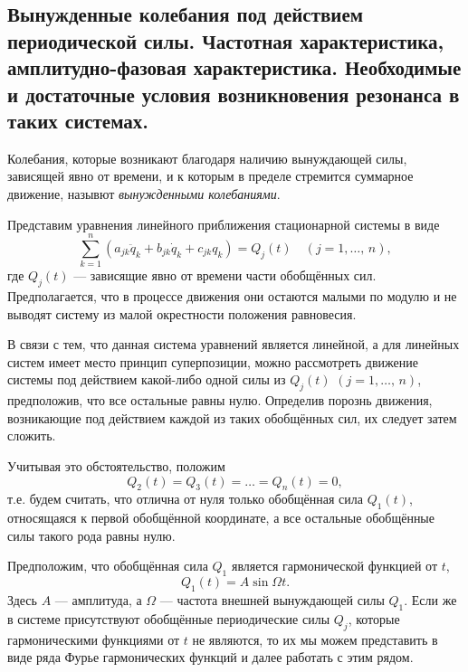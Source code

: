 \documentclass[a4paper]{article}
\begin{document}
\subsection{Вынужденные колебания под действием периодической силы. Частотная
характеристика, амплитудно-фазовая характеристика. Необходимые и достаточные
условия возникновения резонанса в таких системах.}
\begin{dfn}
	Колебания, которые возникают благодаря наличию вынуждающей силы,
	зависящей явно от времени, и к которым в пределе стремится суммарное
	движение, назывют \emph{вынужденными колебаниями}.
\end{dfn}
Представим уравнения линейного приближения стационарной системы в виде
\[
	\sum_{k=1}^{n} (a_{jk}\ddot{q}_k+b_{jk}\dot{q}_k+c_{jk}q_k)=Q_j (t)
	\quad (j=1,\ldots,\,n),
\] 
где $Q_j (t)$ --- зависящие явно от времени части обобщённых сил.
Предполагается, что в процессе движения они остаются малыми по модулю и не
выводят систему из малой окрестности положения равновесия.

В связи с тем, что данная система уравнений является линейной, а для линейных
систем имеет место принцип суперпозиции, можно рассмотреть движение системы
под действием какой-либо одной силы из $Q_j(t)$ $(j=1,\ldots,\,n)$, предположив,
что все остальные равны нулю. Определив порознь движения, возникающие под
действием каждой из таких обобщённых сил, их следует затем сложить.

Учитывая это обстоятельство, положим
\[
	Q_2(t)=Q_3(t)=\ldots=Q_n(t)=0,
\]
т.\:е. будем считать, что отлична от нуля только обобщённая сила $Q_1(t)$,
относящаяся к первой обобщённой координате, а все остальные обобщённые силы
такого рода равны нулю.

Предположим, что обобщённая
сила $Q_1$ является гармонической функцией от $t$,
\[
	Q_1(t)=A \sin \Omega t
.\]
Здесь $A$ --- амплитуда, а $\Omega$ --- частота внешней вынуждающей силы $Q_1$.
Если же в системе присутствуют обобщённые периодические силы $Q_j$, которые
гармоническими функциями от  $t$ не являются, то их мы можем представить в
виде ряда Фурье гармонических функций и далее работать с этим рядом.
 
\end{document}
